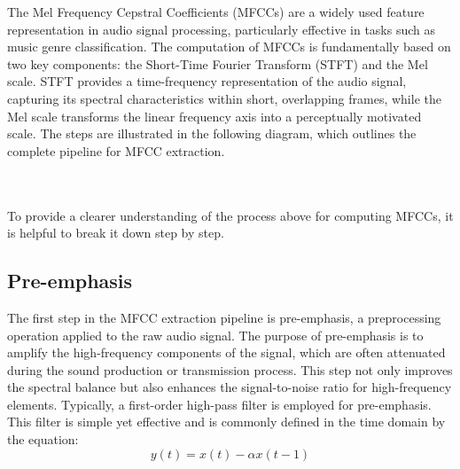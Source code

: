 The Mel Frequency Cepstral Coefficients (MFCCs) are a widely used feature representation in audio signal processing, particularly effective in tasks such as music genre classification. The computation of MFCCs is fundamentally based on two key components: the Short-Time Fourier Transform (STFT) and the Mel scale. STFT provides a time-frequency representation of the audio signal, capturing its spectral characteristics within short, overlapping frames, while the Mel scale transforms the linear frequency axis into a perceptually motivated scale. The steps are illustrated in the following diagram, which outlines the complete pipeline for MFCC extraction.
\\

\usetikzlibrary{arrows.meta}
\\
\\
To provide a clearer understanding of the process above for computing MFCCs, it is helpful to break it down step by step.\\
\subsection{Pre-emphasis}
The first step in the MFCC extraction pipeline is pre-emphasis, a preprocessing operation applied to the raw audio signal. The purpose of pre-emphasis is to amplify the high-frequency components of the signal, which are often attenuated during the sound production or transmission process. This step not only improves the spectral balance but also enhances the signal-to-noise ratio for high-frequency elements. Typically, a first-order high-pass filter is employed for pre-emphasis. This filter is simple yet effective and is commonly defined in the time domain by the equation:\\
\begin{equation}
y(t)=x(t)-\alpha x(t-1) \label{pre-emphasis}
\end{equation}


